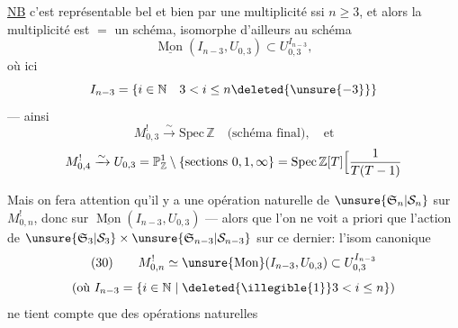 
\uline{NB} c'est  représentable bel et bien par une multiplicité ssi $n\geq3$,  et alors la multiplicité est $=$ un schéma, isomorphe d'ailleurs  au schéma
\[
\underline{\operatorname{Mon}}(I_{n-3},U_{0,3})\subset U_{0,3}^{I_{n-3}},
\]
où ici
\[
I_{n-3}=\{i\in\mathbb N\quad3<i\leq n\deleted{\unsure{-3}}\}
\]
--- ainsi 
\[
M_{0,3}^{!}\xrightarrow{\sim}\mathrm{Spec}\,\mathbb Z\quad\text{(schéma final)},\quad\text{et}
\]
\[
M_{0,4}^{!}\xrightarrow{\sim}U_{0,3}=\mathbb P^1_{\mathbb Z}\setminus\{\text{sections }0,1,\infty\}=\mathrm{Spec}\,\mathbb Z[T]\Bigl[\frac{1}{T(T-1)}
\]

Mais on fera attention qu'il y a une opération naturelle de $\unsure{\mathfrak S_n|\mathcal S_n}$ sur $M_{0,n}^{!}$, donc sur $\underline{\operatorname{Mon}}(I_{n-3},U_{0,3})$ ---  alors que l'on ne voit a priori que l'action de $\unsure{\mathfrak S_3|\mathcal S_3}\times\unsure{\mathfrak S_{n-3}|\mathcal S_{n-3}}$ sur ce dernier: l'isom canonique
\[
(30)\qquad M_{0,n}^{!}\simeq\unsure{\operatorname{Mon}}(I_{n-3},U_{0,3})\subset U_{0,3}^{I_{n-3}}
\]
\[
\text{(où }I_{n-3}=\{i\in\mathbb N\mid\deleted{\illegible{1}}3<i\leq n\}\text{)}
\]
ne tient compte que des opérations naturelles 
